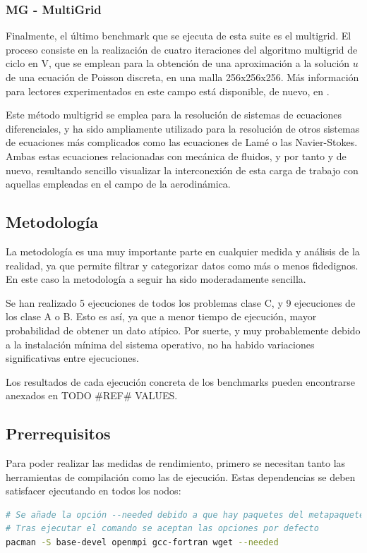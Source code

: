\subsubsection{MG - MultiGrid}
Finalmente, el último benchmark que se ejecuta de esta suite es el multigrid. El proceso consiste en la realización de cuatro iteraciones del algoritmo multigrid de ciclo en V, que se emplean para la obtención de una aproximación a la solución $u$ de una ecuación de Poisson discreta, en una malla 256x256x256. Más información para lectores experimentados en este campo está disponible, de nuevo, en \cite[2.2.2]{benchmarks1994technical}.

Este método multigrid se emplea para la resolución de sistemas de ecuaciones diferenciales, y ha sido ampliamente utilizado para la resolución de otros sistemas de ecuaciones más complicados como las ecuaciones de Lamé o las Navier-Stokes. Ambas estas ecuaciones relacionadas con mecánica de fluidos, y por tanto y de nuevo, resultando sencillo visualizar la interconexión de esta carga de trabajo con aquellas empleadas en el campo de la aerodinámica.  

\subsection{Metodología}
La metodología es una muy importante parte en cualquier medida y análisis de la realidad, ya que permite filtrar y categorizar datos como más o menos fidedignos. En este caso la metodología a seguir ha sido moderadamente sencilla.

Se han realizado 5 ejecuciones de todos los problemas clase C, y 9 ejecuciones de los clase A o B. Esto es así, ya que a menor tiempo de ejecución, mayor probabilidad de obtener un dato atípico. Por suerte, y muy probablemente debido a la instalación mínima del sistema operativo, no ha habido variaciones significativas entre ejecuciones.

Los resultados de cada ejecución concreta de los benchmarks pueden encontrarse anexados en TODO \#REF\# VALUES.

\subsection{Prerrequisitos}
Para poder realizar las medidas de rendimiento, primero se necesitan tanto las herramientas de compilación como las de ejecución. Estas dependencias se deben satisfacer ejecutando en todos los nodos:

\begin{lstlisting}[language=bash]
# Se añade la opción --needed debido a que hay paquetes del metapaquete base-devel que ya están instalados, y no es necesario reinstalar.
# Tras ejecutar el comando se aceptan las opciones por defecto
pacman -S base-devel openmpi gcc-fortran wget --needed
\end{lstlisting}

